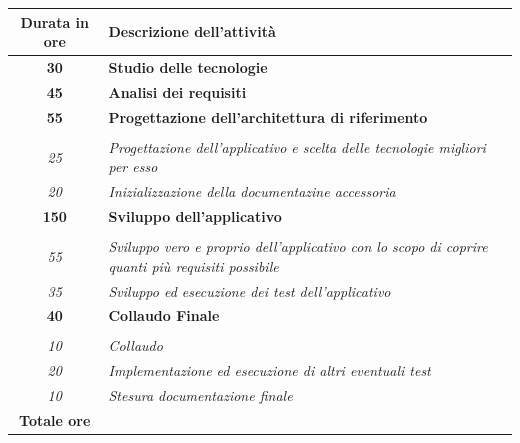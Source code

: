 

\begin{tabularx}{\textwidth}{|c|X|}
	\hline
	\textbf{Durata in ore} & \textbf{Descrizione dell'attività} \\\hline
	
	\textbf{30} & \textbf{Studio delle tecnologie} \\	 
    \hline

    \textbf{45} & \textbf{Analisi dei requisiti} \\ \hline
     
    \textbf{55} & \textbf{Progettazione dell'architettura di riferimento} \\ \hdashline 
    \multirow{3}{0cm}\\ 
    \textit{25} & 
    \textit{Progettazione dell'applicativo e scelta delle tecnologie migliori per esso} \\
    \textit{20} & 
    \textit{Inizializzazione della documentazine accessoria} \\
    \hline

    \textbf{150} & \textbf{Sviluppo dell'applicativo} \\ \hdashline 
    \multirow{3}{0cm}\\
    \textit{55} & \textit{Sviluppo vero e proprio dell'applicativo con lo scopo di coprire quanti più requisiti possibile} \\
    \textit{35} & \textit{Sviluppo ed esecuzione dei test dell'applicativo} \\ \hline
    
    \textbf{40} & \textbf{Collaudo Finale}  \\ \hdashline 
    \multirow{4}{0cm}\\ 
    \textit{10} & 
    \textit{Collaudo} \\
    \textit{20} & \textit{Implementazione ed esecuzione di altri eventuali test} \\
    \textit{10} & 
    \textit{Stesura documentazione finale} \\
   
    \hline
	
	\textbf{Totale ore} & \multicolumn{1}{|c|}{\textbf{\totaleOre}} \\\hline
	
	
\end{tabularx}